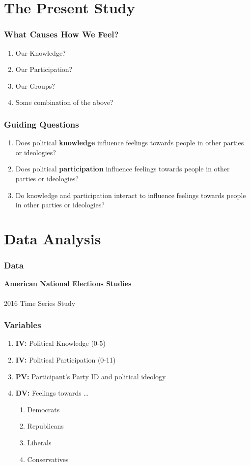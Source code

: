 \documentclass[14pt]{beamer}
\newcommand\tb{\textbf}
\begin{document}
\section{The Present Study}

\begin{frame}
\frametitle{What Causes How We Feel?}
\begin{enumerate}
	\item Our Knowledge?
	\item Our Participation?
	\item Our Groups?
	\item Some combination of the above?
\end{enumerate}
\end{frame}

\begin{frame}
\frametitle{Guiding Questions}
\begin{enumerate}
	\item Does political \tb{knowledge} influence feelings towards people in other parties or ideologies?
	\item Does political \tb{participation} influence feelings towards people in other parties or ideologies?
	\item Do knowledge and participation interact to influence feelings towards people in other parties or ideologies?
\end{enumerate}
\end{frame}


\section{Data Analysis}

\begin{frame}
\frametitle{Data}
\begin{center}
	\tb{American National Elections Studies}
	~~\\
	~~\\
	2016 Time Series Study
\end{center}
\end{frame}

\begin{frame}
\frametitle{Variables}
\begin{enumerate}
	\item \tb{IV:} Political Knowledge (0-5)
	\item \tb{IV:} Political Participation (0-11)
	\item \tb{PV:} Participant's Party ID and political ideology
	\item \tb{DV:} Feelings towards \ldots
	\begin{enumerate}
		\item Democrats
		\item Republicans
		\item Liberals
		\item Conservatives
	\end{enumerate}
\end{enumerate}
\end{frame}
\end{document}
